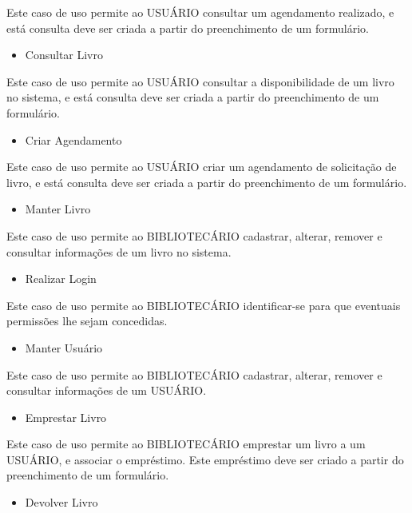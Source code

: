 Este caso de uso permite ao USUÁRIO consultar um agendamento realizado, e está consulta deve ser criada a partir do preenchimento de um formulário.

\begin{itemize}
\item{Consultar Livro}
\end{itemize}

Este caso de uso permite ao USUÁRIO consultar a disponibilidade de um livro no sistema, e está consulta deve ser criada a partir do preenchimento de um formulário.

\begin{itemize}
\item{Criar Agendamento}
\end{itemize}

Este caso de uso permite ao USUÁRIO criar um agendamento de solicitação de livro, e está consulta deve ser criada a partir do preenchimento de um formulário.

\begin{itemize}
\item{Manter Livro}
\end{itemize}

Este caso de uso permite ao BIBLIOTECÁRIO cadastrar, alterar, remover e consultar informações de um livro no sistema.

\begin{itemize}
\item{Realizar Login}
\end{itemize}

Este caso de uso permite ao BIBLIOTECÁRIO identificar-se para que eventuais permissões lhe sejam concedidas.

\begin{itemize}
\item{Manter Usuário}
\end{itemize}

Este caso de uso permite ao BIBLIOTECÁRIO cadastrar, alterar, remover e consultar informações de um USUÁRIO.

\begin{itemize}
\item{Emprestar Livro}
\end{itemize}

Este caso de uso permite ao BIBLIOTECÁRIO emprestar um livro a um USUÁRIO, e associar o empréstimo. Este empréstimo deve ser criado a partir do preenchimento de um formulário. 

\begin{itemize}
\item{Devolver Livro}
\end{itemize}

